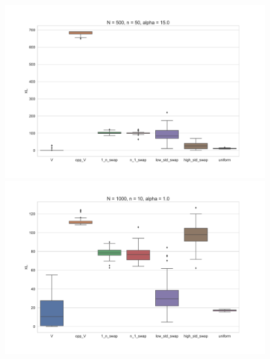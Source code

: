 \documentclass[11pt, oneside]{article}   	%
\begin{document}
\begin{figure}[h!]
\begin{minipage}[t]{.23\textwidth}
	\end{minipage}
	\hfill
	\begin{minipage}[t]{.23\textwidth}
		\centering
		\includegraphics[width=\textwidth]{figures/theorem2_2/N500n50alpha15.pdf}
		
	\end{minipage} 

	
	\begin{minipage}[t]{.23\textwidth}
		\centering
		\includegraphics[width=\textwidth]{figures/theorem2_2/N1000n10alpha1.pdf}
		

\end{minipage}
\end{figure}
\end{document}
